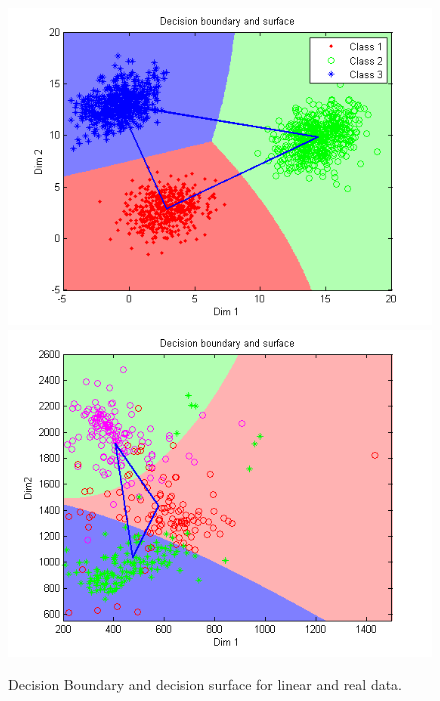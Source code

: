\documentclass[10pt]{report}
\begin{document}
\begin{figure}[!htb]
  \includegraphics[width=\linewidth]{des_lin.png}
\endminipage\hfill
{}
  \includegraphics[width=\linewidth]{des_real.png}
\endminipage\hfill
\caption{Decision Boundary and decision surface for linear and real data.}
\end{figure}
\end{document}
